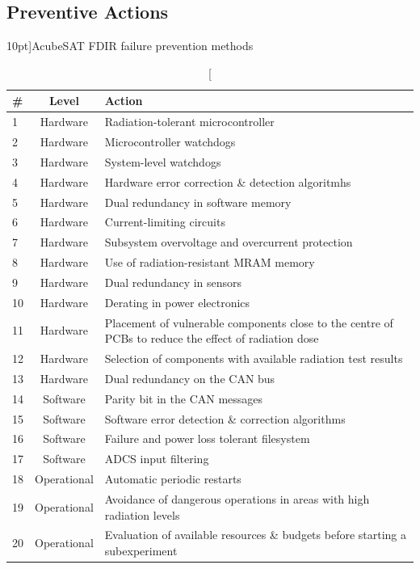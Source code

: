 \documentclass[a4paper,nobib]{tufte-book}
\begin{document}
\clearpage
\subsection{Preventive Actions}

\begin{table}[h]
	\centering
	\caption[][10pt]{AcubeSAT \acs{FDIR} failure prevention methods}
	\label{tab:fdir_preventive}
	\renewcommand{\arraystretch}{1.5}
	\begin{tabularx}{\textwidth}{@{}lcX@{}}
		\toprule
		\# & Level & Action \\ \midrule
		1 & Hardware & Radiation-tolerant microcontroller \\
		2 & Hardware & Microcontroller watchdogs \parencite{beningo_review_watchdog_2010} \\
		3 & Hardware & System-level watchdogs \\
		4 & Hardware & Hardware error correction \& detection algoritmhs \\
		5 & Hardware & Dual redundancy in software memory \\
		6 & Hardware & Current-limiting circuits \\
		7 & Hardware & Subsystem overvoltage and overcurrent protection \\
		8 & Hardware & Use of radiation-resistant \acs{MRAM} memory \\
		9 & Hardware & Dual redundancy in sensors \\
		10 & Hardware & Derating in power electronics \\
		11 & Hardware & Placement of vulnerable components close to the centre of \acsp{PCB} to reduce the effect of radiation dose \\
		12 & Hardware & Selection of components with available radiation test results \\
		13 & Hardware & Dual redundancy on the \acs{CAN} bus \\
		14 & Software & Parity bit in the \acs{CAN} messages \\
		15 & Software & Software error detection \& correction algorithms \\
		16 & Software & Failure and power loss tolerant filesystem \\
		17 & Software & \acs{ADCS} input filtering \\
		18 & Operational & Automatic periodic restarts \\
		19 & Operational & Avoidance of dangerous operations in areas with high radiation levels \\
		20 & Operational & Evaluation of available resources \& budgets before starting a subexperiment \\ \bottomrule
	\end{tabularx}
\end{table}
\end{document}
